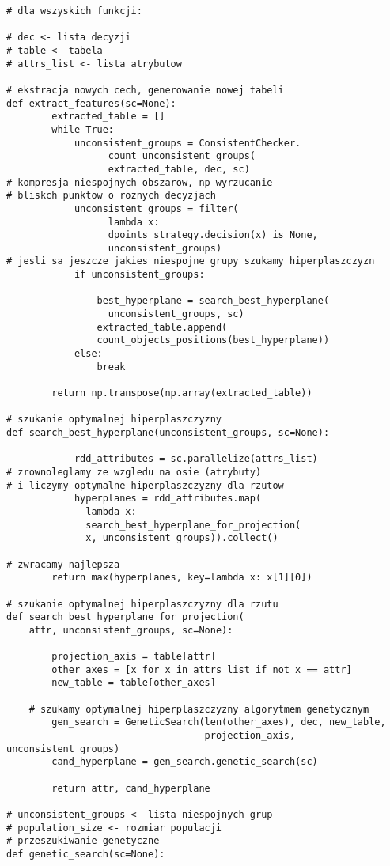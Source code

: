 \documentclass[magisterska]{pracamgr}
\theoremstyle{plain}
\theoremstyle{definition}
\theoremstyle{remark}
\begin{document}
\begin{lstlisting}
# dla wszyskich funkcji:

# dec <- lista decyzji
# table <- tabela 
# attrs_list <- lista atrybutow

# ekstracja nowych cech, generowanie nowej tabeli
def extract_features(sc=None):
        extracted_table = []
        while True:
            unconsistent_groups = ConsistentChecker.
				  count_unconsistent_groups(
				  extracted_table, dec, sc)
# kompresja niespojnych obszarow, np wyrzucanie 
# bliskch punktow o roznych decyzjach
            unconsistent_groups = filter(
				  lambda x: 
				  dpoints_strategy.decision(x) is None, 
				  unconsistent_groups)
# jesli sa jeszcze jakies niespojne grupy szukamy hiperplaszczyzn
            if unconsistent_groups:
            
                best_hyperplane = search_best_hyperplane(
				  unconsistent_groups, sc)
                extracted_table.append(
				count_objects_positions(best_hyperplane))
            else:
                break

        return np.transpose(np.array(extracted_table))

# szukanie optymalnej hiperplaszczyzny
def search_best_hyperplane(unconsistent_groups, sc=None):

            rdd_attributes = sc.parallelize(attrs_list)
# zrownoleglamy ze wzgledu na osie (atrybuty)
# i liczymy optymalne hiperplaszczyzny dla rzutow
            hyperplanes = rdd_attributes.map(
			  lambda x: 
			  search_best_hyperplane_for_projection(
			  x, unconsistent_groups)).collect()
	
# zwracamy najlepsza
        return max(hyperplanes, key=lambda x: x[1][0])

# szukanie optymalnej hiperplaszczyzny dla rzutu
def search_best_hyperplane_for_projection(
    attr, unconsistent_groups, sc=None):

        projection_axis = table[attr]
        other_axes = [x for x in attrs_list if not x == attr]
        new_table = table[other_axes]
	
	# szukamy optymalnej hiperplaszczyzny algorytmem genetycznym
        gen_search = GeneticSearch(len(other_axes), dec, new_table,
                                   projection_axis, unconsistent_groups)
        cand_hyperplane = gen_search.genetic_search(sc)

        return attr, cand_hyperplane

# unconsistent_groups <- lista niespojnych grup
# population_size <- rozmiar populacji
# przeszukiwanie genetyczne
def genetic_search(sc=None):


\end{lstlisting}
\end{document}
